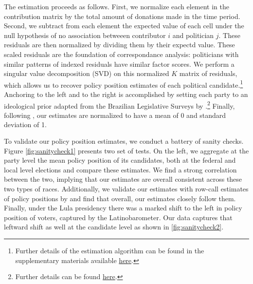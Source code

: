 \documentclass[12pt,english]{article}
\numberwithin{equation}{section}
\theoremstyle{plain}
\theoremstyle{remark}
\theoremstyle{plain}
\begin{document}
The estimation proceeds as follows. First, we normalize each element in the contribution matrix by the total amount of donations made in the time period. Second, we subtract from each element the expected value of each cell under the null hypothesis of no association betweeen contributor $i$ and politician $j$. These residuals are then normalized by dividing them by their expectd value. These scaled residuals are the foundation of correspondance analysis: politicians with similar patterns of indexed residuals have similar factor scores. We perform a singular value decomposition (SVD) on this normalized $K$ matrix of residuals, which allows us to recover policy position estimates of each political candidate.\footnote{Further details of the estimation algorithm can be found in the supplementary materials available \href{https://onlinelibrary.wiley.com/doi/abs/10.1111/ajps.12062}{here}.} Anchoring to the left and to the right is accomplished by setting each party to an ideological prior adapted from the Brazilian Legislative Surveys by .\footnote{Further details can be found \href{https://dataverse.harvard.edu/dataset.xhtml?persistentId=doi:10.7910/DVN/8USPML}{here}.} Finally, following , our estimates are normalized to have a mean of 0 and standard deviation of 1.

To validate our policy position estimates, we conduct a battery of sanity checks. Figure \ref{fig:sanitycheck1} presents two set of tests. On the left, we aggregate at the party level the mean policy position of its candidates, both at the federal and local level elections and compare these estimates. We find a strong correlation between the two, implying that our estimates are overall consistent across these two types of races. Additionally, we validate our estimates with row-call estimates of policy positions by  and find that overall, our estimates closely follow them. Finally, under the Lula presidency there was a marked shift to the left in policy position of voters, captured by the Latinobarometer. Our data captures that leftward shift as well at the candidate level as shown in \ref{fig:sanitycheck2}.
\end{document}
